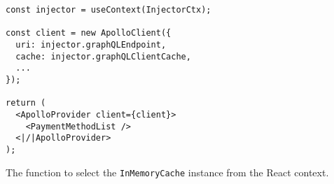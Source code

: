 \ifshowListings
\begin{listing}[H]
  \begin{verbatim}
const injector = useContext(InjectorCtx);

const client = new ApolloClient({
  uri: injector.graphQLEndpoint,
  cache: injector.graphQLClientCache,
  ...
});

return (
  <ApolloProvider client={client}>
    <PaymentMethodList />
  <|/|ApolloProvider>
);
  \end{verbatim}
  \caption{The function to select the \texttt{InMemoryCache} instance from the React context.}\label{code:applied-methods:prototypical-implementation:consume-react-context}
\end{listing}
\fi
